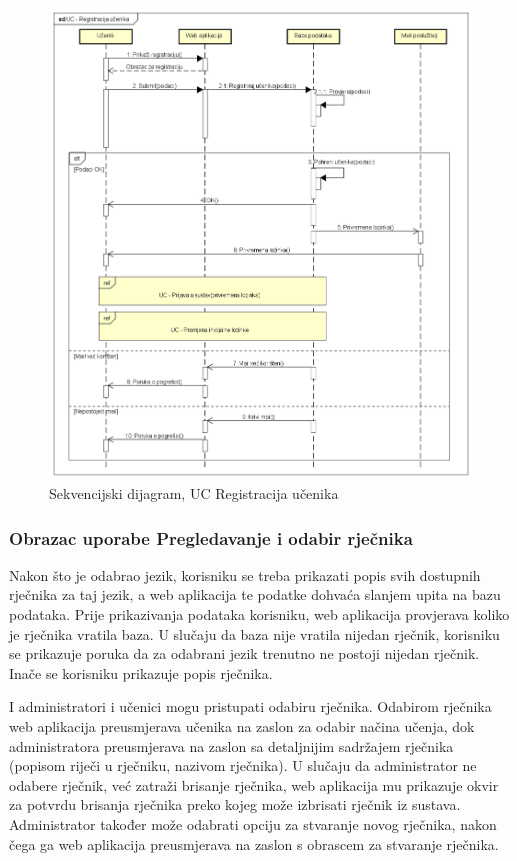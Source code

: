 \begin{figure}[htp]
	\includegraphics[scale=0.45]{dijagrami/UC - Registracija ucenika.png} 
	\centering
	\caption{Sekvencijski dijagram, UC Registracija učenika}
	\label{fig:uc-registracija}
\end{figure}

\subsubsection{{Obrazac uporabe Pregledavanje i odabir rječnika}}

Nakon što je odabrao jezik, korisniku se treba prikazati popis svih dostupnih rječnika za taj jezik, a web aplikacija te podatke dohvaća slanjem upita na bazu podataka. Prije prikazivanja podataka korisniku, web aplikacija provjerava koliko je rječnika vratila baza. U slučaju da baza nije vratila nijedan rječnik, korisniku se prikazuje poruka da za odabrani jezik trenutno ne postoji nijedan rječnik. Inače se korisniku prikazuje popis rječnika.

I administratori i učenici mogu pristupati odabiru rječnika. Odabirom rječnika web aplikacija preusmjerava učenika na zaslon za odabir načina učenja, dok administratora preusmjerava na zaslon sa detaljnijim sadržajem rječnika (popisom riječi u rječniku, nazivom rječnika). U slučaju da administrator ne odabere rječnik, već zatraži brisanje rječnika, web aplikacija mu prikazuje okvir za potvrdu brisanja rječnika preko kojeg može izbrisati rječnik iz sustava. Administrator također može odabrati opciju za stvaranje novog rječnika, nakon čega ga web aplikacija preusmjerava na zaslon s obrascem za stvaranje rječnika.

